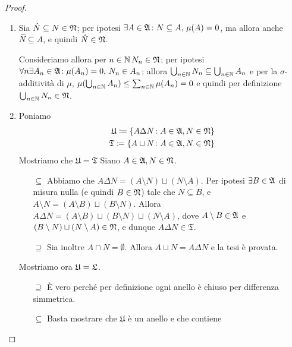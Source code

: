 \documentclass[../EserciziIstituzioniAnalisi.tex]{subfiles}
\begin{document}
\begin{proof}
  \begin{enumerate}
    \item Sia $\hat N\subseteq N \in \mathfrak N$; per ipotesi $\exists A\in \mathfrak A \colon N \subseteq A,\, \mu(A)=0$, ma allora anche $\hat N \subseteq A$, e quindi $\hat N \in \mathfrak N$.

    Consideriamo allora per $n \in \mathbb N\, N_n \in \mathfrak N$; per ipotesi $\forall n \exists A_n\in \mathfrak A \colon \mu(A_n)=0,\, N_n\in A_n$; allora $\bigcup_{n \in \mathbb N} N_n\subseteq \bigcup_{n \in \mathbb N} A_n$ e per la $\sigma$-additività di $\mu$, $\mu(\bigcup_{n \in \mathbb N} A_n)\leq \sum_{n\in\mathbb N}\mu(A_n)=0$ e quindi per definizione $\bigcup_{n \in \mathbb N} N_n\in \mathfrak N$.
    \item Poniamo
    \begin{equation*}
      \begin{aligned}
        \mathfrak{U}\coloneqq \left\{A\Delta N\colon A\in\mathfrak A,N\in\mathfrak N\right\}\\
        \mathfrak{T}\coloneqq \left\{A\sqcup N\colon A\in\mathfrak A,N\in\mathfrak N\right\}
      \end{aligned}
    \end{equation*}
    Mostriamo che $\mathfrak{U}=\mathfrak{T}$
    Siano $A\in\mathfrak A,N\in\mathfrak N$.
    \begin{itemize}
      \item[$\subseteq$] Abbiamo che $A\Delta N=(A\setminus N)\sqcup (N\setminus A)$. Per ipotesi $\exists B\in\mathfrak A$ di misura nulla (e quindi $B\in\mathfrak N$) tale che $N\subseteq B$, e $A\setminus N=(A\setminus B)\sqcup (B\setminus N)$. Allora $A\Delta N=(A\setminus B)\sqcup (B\setminus N)\sqcup (N\setminus A)$, dove $A\setminus B\in \mathfrak A$ e $(B\setminus N)\sqcup (N\setminus A)\in \mathfrak N$, e dunque $A\Delta N\in \mathfrak{T}$.
      \item[$\supseteq$] Sia inoltre $A\cap N=\emptyset$. Allora $A\sqcup N=A\Delta N$ e la tesi è provata.
    \end{itemize}
    Mostriamo ora $\mathfrak{U}=\mathfrak L$.
    \begin{itemize}
      \item[$\supseteq$] È vero perché per definizione ogni anello è chiuso per differenza simmetrica.
      \item[$\subseteq$] Basta mostrare che $\mathfrak{U}$ è un anello e che contiene 
    \end{itemize}
  \end{enumerate}
\end{proof}
\end{document}
